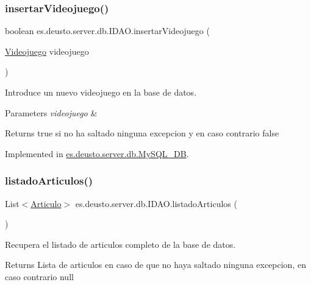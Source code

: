 \subsubsection{\texorpdfstring{insertarVideojuego()}{insertarVideojuego()}}
{\footnotesize\ttfamily boolean es.\+deusto.\+server.\+db.\+I\+D\+A\+O.\+insertar\+Videojuego (\begin{DoxyParamCaption}\item[{\mbox{\hyperlink{classes_1_1deusto_1_1client_1_1data_1_1_videojuego}{Videojuego}}}]{videojuego }\end{DoxyParamCaption})}

Introduce un nuevo videojuego en la base de datos. 
\begin{DoxyParams}{Parameters}
{\em videojuego} & \\
\hline
\end{DoxyParams}
\begin{DoxyReturn}{Returns}
true si no ha saltado ninguna excepcion y en caso contrario false 
\end{DoxyReturn}


Implemented in \mbox{\hyperlink{classes_1_1deusto_1_1server_1_1db_1_1_my_s_q_l___d_b_a2da5706482d7ada9b3b1479fc172f956}{es.\+deusto.\+server.\+db.\+My\+S\+Q\+L\+\_\+\+DB}}.

\mbox{\label{interfacees_1_1deusto_1_1server_1_1db_1_1_i_d_a_o_a7c573cd5b9d26960fc8eeeec4db1e5e5}} 
\subsubsection{\texorpdfstring{listadoArticulos()}{listadoArticulos()}}
{\footnotesize\ttfamily List$<$\mbox{\hyperlink{classes_1_1deusto_1_1client_1_1data_1_1_articulo}{Articulo}}$>$ es.\+deusto.\+server.\+db.\+I\+D\+A\+O.\+listado\+Articulos (\begin{DoxyParamCaption}{ }\end{DoxyParamCaption})}

Recupera el listado de articulos completo de la base de datos. \begin{DoxyReturn}{Returns}
Lista de articulos en caso de que no haya saltado ninguna excepcion, en caso contrario null 
\end{DoxyReturn}


